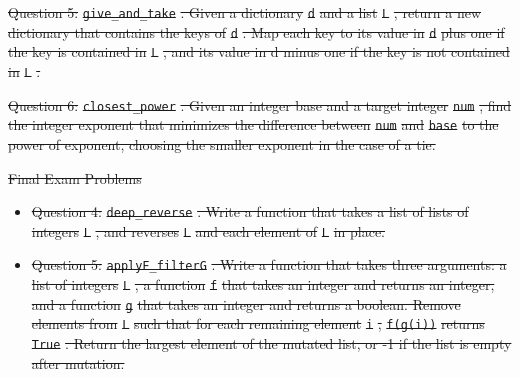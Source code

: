 \documentclass[12pt,twoside]{mitthesis}
\providecommand{\DIFdeltex}[1]{{\protect\color{red}\sout{#1}}}                      %
\providecommand{\DIFdel}[1]{\texorpdfstring{\DIFdeltex{#1}}{}} %
\begin{document}
{{{{{{{{{{%
\DIFdel{Question 5: }\texttt{\DIFdel{give\_and\_take}}%
\DIFdel{. Given a dictionary }\texttt{\DIFdel{d}} %
\DIFdel{and a list }\texttt{\DIFdel{L}}%
\DIFdel{, return a new dictionary that contains the keys of }\texttt{\DIFdel{d}}%
\DIFdel{. Map each key to its value in }\texttt{\DIFdel{d}} %
\DIFdel{plus one if the key is contained in }\texttt{\DIFdel{L}}%
\DIFdel{, and its value in d minus one if the key is not contained in }\texttt{\DIFdel{L}}%
\DIFdel{.
}%


\DIFdel{Question 6: }\texttt{\DIFdel{closest\_power}}%
\DIFdel{. Given an integer base and a target integer }\texttt{\DIFdel{num}}%
\DIFdel{, find the integer exponent that minimizes the difference between }\texttt{\DIFdel{num}} %
\DIFdel{and }\texttt{\DIFdel{base}} %
\DIFdel{to the power of exponent, choosing the smaller exponent in the case of a tie.
}%


\DIFdel{Final Exam Problems}%

 \begin{itemize} %
\item%
\DIFdel{Question 4: }\texttt{\DIFdel{deep\_reverse}}%
\DIFdel{. Write a function that takes a list of lists of integers }\texttt{\DIFdel{L}}%
\DIFdel{, and reverses }\texttt{\DIFdel{L}} %
\DIFdel{and each element of }\texttt{\DIFdel{L}} %
\DIFdel{in place.
}%


\item%
\DIFdel{Question 5: }\texttt{\DIFdel{applyF\_filterG}}%
\DIFdel{. Write a function that takes three arguments: a list of integers }\texttt{\DIFdel{L}}%
\DIFdel{, a function }\texttt{\DIFdel{f}} %
\DIFdel{that takes an integer and returns an integer, and a function }\texttt{\DIFdel{g}} %
\DIFdel{that takes an integer and returns a boolean. Remove elements from }\texttt{\DIFdel{L}} %
\DIFdel{such that for each remaining element }\texttt{\DIFdel{i}}%
\DIFdel{, }\texttt{\DIFdel{f(g(i))}} %
\DIFdel{returns }\texttt{\DIFdel{True}}%
\DIFdel{. Return the largest element of the mutated list, or -1 if the list is empty after mutation.
}%


\end{itemize}}}}}}}}}}}
\end{document}
